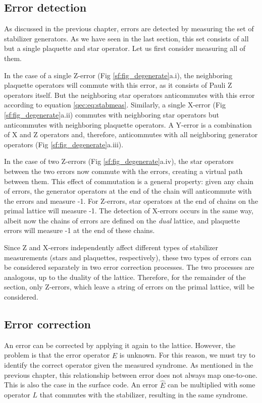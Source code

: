 \subsection{Error detection}
As discussed in the previous chapter, errors are detected by measuring the set of stabilizer generators. As we have seen in the last section, this set consists of all but a single plaquette and star operator. Let us first consider measuring all of them.

In the case of a single Z-error (Fig \ref{sf:fig_degenerate}a.i), the neighboring plaquette operators will commute with this error, as it consists of Pauli Z operators itself. But the neighboring star operators anticommutes with this error according to equation \eqref{qec:eq:stabmeas}. Similarly, a single X-error (Fig \ref{sf:fig_degenerate}a.ii) commutes with neighboring star operators but anticommutes with neighboring plaquette operators. A Y-error is a combination of X and Z operators and, therefore, anticommutes with all neighboring generator operators (Fig \ref{sf:fig_degenerate}a.iii).

In the case of two Z-errors (Fig \ref{sf:fig_degenerate}a.iv), the star operators between the two errors now commute with the errors, creating a virtual path between them. This effect of commutation is a general property: given any chain of errors, the generator operators at the end of the chain will anticommute with the errors and measure -1. For Z-errors, star operators at the end of chains on the primal lattice will measure -1. The detection of X-errors occurs in the same way, albeit now the chains of errors are defined on the \emph{dual} lattice, and plaquette errors will measure -1 at the end of these chains.

Since Z and X-errors independently affect different types of stabilizer measurements (stars and plaquettes, respectively), these two types of errors can be considered separately in two error correction processes. The two processes are analogous, up to the duality of the lattice. Therefore, for the remainder of the section, only Z-errors, which leave a string of errors on the primal lattice, will be considered.


\subsection{Error correction}\label{sec:correction}
An error can be corrected by applying it again to the lattice. However, the problem is that the error operator $\hat{E}$ is unknown. For this reason, we must try to identify the correct operator given the measured syndrome. As mentioned in the previous chapter, this relationship between error does not always map one-to-one. This is also the case in the surface code. An error $\hat{E}$ can be multiplied with some operator $L$ that commutes with the stabilizer, resulting in the same syndrome.

